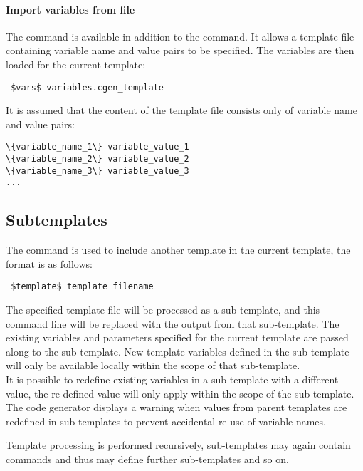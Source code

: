 \documentclass{settings/TU_Delft_Report}
\begin{document}
\paragraph{Import variables from file} The  command is available in addition to the  command. It allows a template file containing variable name and value pairs to be specified. The variables are then loaded for the current template:

\begin{lstlisting}
 $vars$ variables.cgen_template
\end{lstlisting}

It is assumed that the content of the template file consists only of variable name and value pairs:

\begin{lstlisting}[caption={variables.cgen\_template}]
\{variable_name_1\} variable_value_1
\{variable_name_2\} variable_value_2
\{variable_name_3\} variable_value_3
...
\end{lstlisting}


\subsection{Subtemplates}
The  command is used to include another template in the current template, the format is as follows:
\begin{lstlisting}
 $template$ template_filename
\end{lstlisting}

The specified template file will be processed as a sub-template, and this command line will be replaced with the output from that sub-template. The existing variables and parameters specified for the current template are passed along to the sub-template. New template variables defined in the sub-template will only be available locally within the scope of that sub-template.\\

It is possible to redefine existing variables in a sub-template with a different value, the re-defined value will only apply within the scope of the sub-template. The code generator displays a warning when values from parent templates are redefined in sub-templates to prevent accidental re-use of variable names.

Template processing is performed recursively, sub-templates may again contain commands and thus may define further sub-templates and so on.
\end{document}
